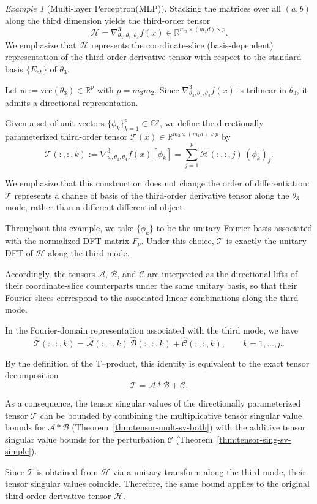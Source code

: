 \documentclass{article}
\theoremstyle{plain}
\theoremstyle{definition}
\theoremstyle{remark}
\newtheorem{example}[theorem]{Example}
\begin{document}
\begin{example}[Multi-layer Perceptron(MLP)]
Stacking the matrices over all $(a,b)$ along the third dimension yields the third-order tensor
\[
\mathcal{H}
=
\nabla^{3}_{\theta_{3}, \theta_{1}, \theta_{4}} f(x)
\in \mathbb{R}^{m_{3} \times (m_{1}d) \times p}.
\]
We emphasize that $\mathcal{H}$ represents the coordinate-slice (basis-dependent)
representation of the third-order derivative tensor with respect to the standard
basis $\{E_{ab}\}$ of $\theta_3$.


Let $w := \mathrm{vec}(\theta_3)\in\mathbb{R}^{p}$ with $p=m_3 m_2$.
Since $\nabla^3_{\theta_3,\theta_1,\theta_4} f(x)$ is trilinear in $\theta_3$,
it admits a directional representation.


Given a set of unit vectors $\{\phi_k\}_{k=1}^p \subset \mathbb{C}^p$,
we define the directionally parameterized third-order tensor
$\mathcal{T}(x)\in\mathbb{R}^{m_3\times(m_1d)\times p}$ by
\[
\mathcal{T}(:,:,k)
:=
\nabla^{3}_{w,\theta_1,\theta_4} f(x)[\phi_k]
=
\sum_{j=1}^{p} \mathcal{H}(:,:,j)\,(\phi_k)_j .
\]

We emphasize that this construction does not change the order of
differentiation: $\mathcal{T}$ represents a change of basis of the third-order
derivative tensor along the $\theta_3$ mode, rather than a different
differential object.



Throughout this example, we take $\{\phi_k\}$ to be the unitary Fourier basis associated with the normalized DFT matrix $F_p$.
Under this choice, $\mathcal{T}$ is exactly the unitary DFT of $\mathcal{H}$ along the third mode.

Accordingly, the tensors $\mathcal{A}$, $\mathcal{B}$, and $\mathcal{C}$ are
interpreted as the directional lifts of their coordinate-slice counterparts
under the same unitary basis, so that their Fourier slices correspond to the
associated linear combinations along the third mode.


In the Fourier-domain representation associated with the third mode, we have
\[
\widehat{\mathcal{T}}(:,:,k)
=
\widehat{\mathcal{A}}(:,:,k)\,\widehat{\mathcal{B}}(:,:,k)
+
\widehat{\mathcal{C}}(:,:,k),
\qquad k=1,\dots,p.
\]


By the definition of the T--product, this identity is equivalent to the exact
tensor decomposition
\[
\mathcal{T} = \mathcal{A} * \mathcal{B} + \mathcal{C}.
\]


As a consequence, the tensor singular values of the directionally parameterized tensor $\mathcal{T}$ can be bounded by combining the multiplicative tensor singular value bounds for $\mathcal{A}*\mathcal{B}$
(Theorem~\ref{thm:tensor-mult-sv-both}) with the additive tensor singular value bounds for the perturbation $\mathcal{C}$
(Theorem~\ref{thm:tensor-sing-sv-simple}).

Since $\mathcal{T}$ is obtained from $\mathcal{H}$ via a unitary transform along the third mode, their tensor singular values coincide. Therefore, the same bound applies to the original third-order derivative
tensor $\mathcal{H}$.

\end{example}
\end{document}
